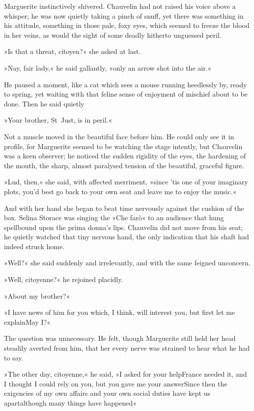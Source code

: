 Marguerite instinctively shivered. Chauvelin had not raised his voice above a whisper; he was now quietly taking a pinch of snuff, yet there was something in his attitude, something in those pale, foxy eyes, which seemed to freeze the blood in her veins, as would the sight of some deadly hitherto unguessed peril.

»Is that a threat, citoyen?« she asked at last.

»Nay, fair lady,« he said gallantly, »only an arrow shot into the air.«

He paused a moment, like a cat which sees a mouse running heedlessly by, ready to spring, yet waiting with that feline sense of enjoyment of mischief about to be done. Then he said quietly\longdash


»Your brother, St~Just, is in peril.«

Not a muscle moved in the beautiful face before him. He could only see it in profile, for Marguerite seemed to be watching the stage intently, but Chauvelin was a keen observer; he noticed the sudden rigidity of the eyes, the hardening of the mouth, the sharp, almost paralysed tension of the beautiful, graceful figure.

»Lud, then,« she said, with affected merriment, »since 'tis one of your imaginary plots, you'd best go back to your own seat and leave me to enjoy the music.«

And with her hand she began to beat time nervously against the cushion of the box. Selina Storace was singing the »Che farò« to an audience that hung spellbound upon the prima donna's lips. Chauvelin did not move from his seat; he quietly watched that tiny nervous hand, the only indication that his shaft had indeed struck home.

»Well?« she said suddenly and irrelevantly, and with the same feigned unconcern.

»Well, citoyenne?« he rejoined placidly.

»About my brother?«

»I have news of him for you which, I think, will interest you, but first let me explain\textellipsis \allowbreak  May I?«

The question was unnecessary. He felt, though Marguerite still held her head steadily averted from him, that her every nerve was strained to hear what he had to say.

»The other day, citoyenne,« he said, »I asked for your help\textellipsis \allowbreak  France needed it, and I thought I could rely on you, but you gave me your answer\textellipsis \allowbreak  Since then the exigencies of my own affairs and your own social duties have kept us apart\textellipsis \allowbreak  although many things have happened\textellipsis«

